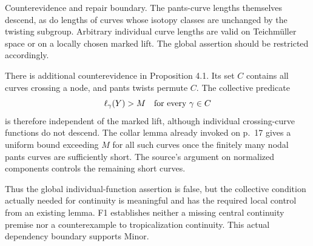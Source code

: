 \documentclass[10pt]{article}
\begin{document}
Counterevidence and repair boundary. The pants-curve lengths themselves descend, as do lengths of curves whose isotopy classes are unchanged by the twisting subgroup. Arbitrary individual curve lengths are valid on Teichmüller space or on a locally chosen marked lift. The global assertion should be restricted accordingly.\par
There is additional counterevidence in Proposition 4.1. Its set \(C\) contains all curves crossing a node, and pants twists permute \(C\). The collective predicate \[\ell_\gamma(Y)>M\quad\hbox{for every }\gamma\in C\] is therefore independent of the marked lift, although individual crossing-curve functions do not descend. The collar lemma already invoked on p. 17 gives a uniform bound exceeding \(M\) for all such curves once the finitely many nodal pants curves are sufficiently short. The source’s argument on normalized components controls the remaining short curves.\par
Thus the global individual-function assertion is false, but the collective condition actually needed for continuity is meaningful and has the required local control from an existing lemma. F1 establishes neither a missing central continuity premise nor a counterexample to tropicalization continuity. This actual dependency boundary supports Minor.\par
\end{document}
